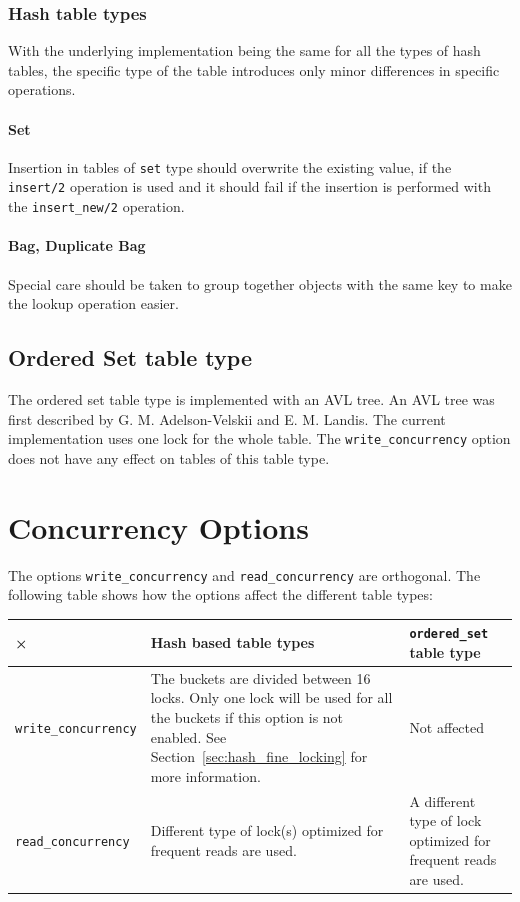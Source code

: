 \documentclass[aps,pre,preprint,nofootinbib]{revtex4}
\begin{document}
\subsubsection{Hash table types}

With the underlying implementation being the same for all the types of hash tables, the specific type of the table introduces only minor differences in specific operations.

\paragraph{Set}

Insertion in tables of \verb|set| type should overwrite the existing value, if the \verb|insert/2| operation is used and it should fail if the insertion is performed with the \verb|insert_new/2| operation.

\paragraph{Bag, Duplicate Bag}

Special care should be taken to group together objects with the same key to make the lookup operation easier.

\subsection{Ordered Set table type}

The ordered set table type is implemented with an AVL tree.
An AVL tree was first described by G. M. Adelson-Velskii and E. M. Landis.
The current implementation uses one lock for the whole table.
The \verb|write_concurrency| option does not have any effect on tables of this table type.

\section{Concurrency Options} \label{sec:concurrency_options}

The options \verb|write_concurrency| and \verb|read_concurrency| are orthogonal.
The following table shows how the options affect the different table types:

\begin{center}
\begin{tabular}{l|p{5cm}|p{5cm}}
× & Hash based table types & \verb|ordered_set| table type \\ \hline
\verb|write_concurrency| & 
The buckets are divided between 16 locks. Only one lock will be used for all the buckets if this option is not enabled. See Section~\ref{sec:hash_fine_locking} for more information. 
& Not affected\\ \hline
\verb|read_concurrency| & 
Different type of lock(s) optimized for frequent reads are used. & 
A different type of lock optimized for frequent reads are used.
\end{tabular}
\end{center} 
\end{document}
